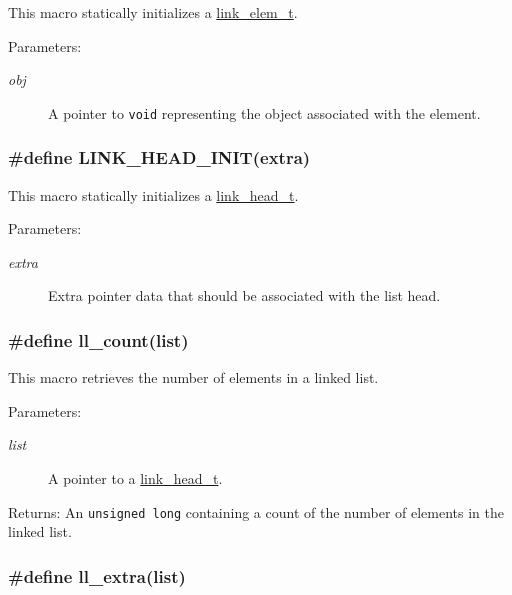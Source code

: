 This macro statically initializes a \hyperlink{group__dbprim__link_a1}{link\_\-elem\_\-t}.

\begin{Desc}
\item[Parameters:]
\begin{description}
\item[{\em obj}]A pointer to {\tt void} representing the object associated with the element. \end{description}
\end{Desc}
\hypertarget{group__dbprim__link_a13}{
\subsubsection[LINK\_\-HEAD\_\-INIT]{\setlength{\rightskip}{0pt plus 5cm}\#define LINK\_\-HEAD\_\-INIT(extra)}}
\label{group__dbprim__link_a13}


This macro statically initializes a \hyperlink{group__dbprim__link_a0}{link\_\-head\_\-t}.

\begin{Desc}
\item[Parameters:]
\begin{description}
\item[{\em extra}]Extra pointer data that should be associated with the list head. \end{description}
\end{Desc}
\hypertarget{group__dbprim__link_a15}{
\subsubsection[ll\_\-count]{\setlength{\rightskip}{0pt plus 5cm}\#define ll\_\-count(list)}}
\label{group__dbprim__link_a15}


This macro retrieves the number of elements in a linked list.

\begin{Desc}
\item[Parameters:]
\begin{description}
\item[{\em list}]A pointer to a \hyperlink{group__dbprim__link_a0}{link\_\-head\_\-t}.\end{description}
\end{Desc}
\begin{Desc}
\item[Returns:]An {\tt unsigned long} containing a count of the number of elements in the linked list. \end{Desc}
\hypertarget{group__dbprim__link_a18}{
\subsubsection[ll\_\-extra]{\setlength{\rightskip}{0pt plus 5cm}\#define ll\_\-extra(list)}}
\label{group__dbprim__link_a18}


